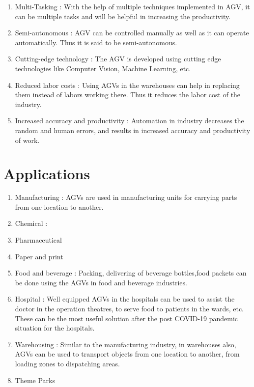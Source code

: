 \begin{enumerate}
    \item Multi-Tasking : With the help of multiple techniques implemented in AGV, it can be multiple tasks and will be helpful in increasing the productivity.
    \item Semi-autonomous : AGV can be controlled manually as well as it can operate automatically. Thus it is said to be semi-autonomous.
    \item Cutting-edge technology : The AGV is developed using cutting edge technologies like Computer Vision, Machine Learning, etc.
    \item Reduced labor costs : Using AGVs in the warehouses can help in replacing them instead of labors working there. Thus it reduces the labor cost of the industry.
    \item Increased accuracy and productivity : Automation in industry decreases the random and human errors, and results in increased accuracy and productivity of work.
\end{enumerate}

\newpage
\section{Applications}
\begin{enumerate}
    \item Manufacturing : AGVs are used in manufacturing units for carrying parts from one location to another.
    \item Chemical :
    \item Pharmaceutical
    \item Paper and print
    \item Food and beverage : Packing, delivering of beverage bottles,food packets can be done using the AGVs in food and beverage industries. 
    \item Hospital : Well equipped AGVs in the hospitals can be used to assist the doctor in the operation theatres, to serve food to patients in the wards, etc. These can be the most useful solution after the post COVID-19 pandemic situation for the hospitals.
    \item Warehousing : Similar to the manufacturing industry, in warehouses also, AGVs can be used to transport objects from one location to another, from loading zones to dispatching areas.
    \item Theme Parks
\end{enumerate}

